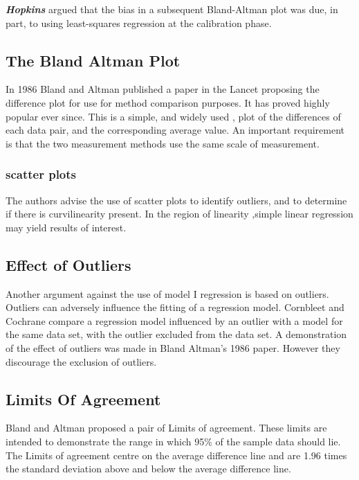 \documentclass[12pt, a4paper]{report}
\theoremstyle{plain}
\theoremstyle{definition}
\theoremstyle{remark}
\begin{document}
	\textbf{\textit{Hopkins}} argued that the bias in a subsequent Bland-Altman plot was
	due, in part, to using least-squares regression at the calibration
	phase.
	
	
	\subsection{The Bland Altman Plot}
	In 1986 Bland and Altman published a paper in the Lancet proposing
	the difference plot for use for method comparison purposes. It has
	proved highly popular ever since. This is a simple, and widely
	used , plot of the differences of each data pair, and the
	corresponding average value. An important requirement is that the
	two measurement methods use the same scale of measurement.
	
	\subsubsection{scatter plots} The authors advise the
	use of scatter plots to identify outliers, and to determine if
	there is curvilinearity present. In the region of linearity
	,simple linear regression may yield results of interest.
	
	\subsection{Effect of Outliers} Another argument against
	the use of model I regression is based on outliers. Outliers can
	adversely influence the fitting of a regression model. Cornbleet
	and Cochrane compare a regression model influenced by an outlier
	with a model for the same data set, with the outlier excluded from
	the data set. A demonstration of the effect of outliers was made
	in Bland Altman's 1986 paper. However they discourage the
	exclusion of outliers.
	
	\subsection{Limits Of Agreement}
	Bland and Altman proposed a pair of Limits of agreement. These
	limits are intended to demonstrate the range in which 95\% of the
	sample data should lie. The Limits of agreement centre on the
	average difference line and are 1.96 times the standard deviation
	above and below the average difference line.
	
\end{document}
